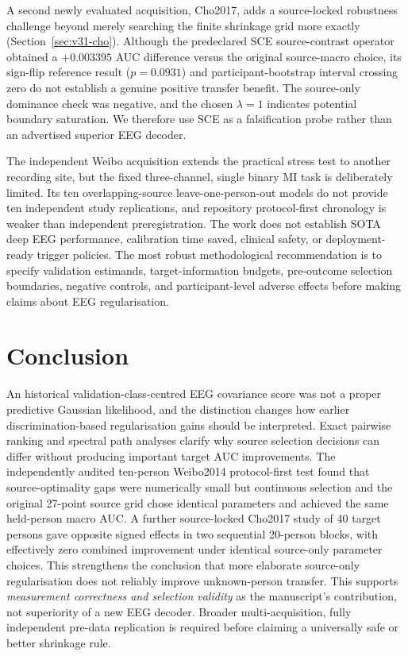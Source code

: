 \documentclass[11pt,a4paper]{article}
\begin{document}
A second newly evaluated acquisition, Cho2017, adds a
source-locked robustness challenge beyond merely searching
the finite shrinkage grid more exactly
(Section~\ref{sec:v31-cho}). Although the predeclared SCE
source-contrast operator obtained a $+0.003395$ AUC
difference versus the original source-macro choice,
its sign-flip reference result ($p=0.0931$) and
participant-bootstrap interval crossing zero do not
establish a genuine positive transfer benefit.
The source-only dominance check was negative, and the
chosen $\lambda=1$ indicates potential boundary saturation.
We therefore use SCE as a falsification probe rather than
an advertised superior EEG decoder.

The independent Weibo acquisition extends the practical
stress test to another recording site, but the fixed
three-channel, single binary MI task is deliberately
limited. Its ten overlapping-source leave-one-person-out
models do not provide ten independent study replications,
and repository protocol-first chronology is weaker than
independent preregistration. The work does not establish
SOTA deep EEG performance, calibration time saved,
clinical safety, or deployment-ready trigger policies.
The most robust methodological recommendation is to
specify validation estimands, target-information budgets,
pre-outcome selection boundaries, negative controls,
and participant-level adverse effects before making
claims about EEG regularisation.

\section{Conclusion}
An historical validation-class-centred EEG covariance score
was not a proper predictive Gaussian likelihood, and
the distinction changes how earlier discrimination-based
regularisation gains should be interpreted. Exact
pairwise ranking and spectral path analyses clarify why
source selection decisions can differ without producing
important target AUC improvements. The independently
audited ten-person Weibo2014 protocol-first test
found that source-optimality gaps were numerically
small but continuous selection and the original
27-point source grid chose identical parameters and
achieved the same held-person macro AUC.
A further source-locked Cho2017 study of 40 target persons
gave opposite signed effects in two sequential 20-person
blocks, with effectively zero combined improvement under
identical source-only parameter choices. This strengthens
the conclusion that more elaborate source-only regularisation
does not reliably improve unknown-person transfer.
This supports \emph{measurement correctness and
selection validity} as the manuscript's contribution,
not superiority of a new EEG decoder. Broader
multi-acquisition, fully independent pre-data
replication is required before claiming a universally
safe or better shrinkage rule.
\end{document}
